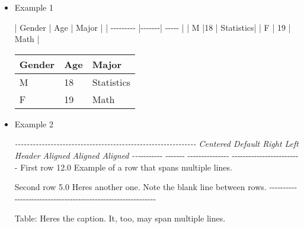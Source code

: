 \documentclass[]{ctexbook}
\newenvironment{Shaded}{\begin{snugshade}}{\end{snugshade}}
\newcommand{\CommentTok}[1]{\textcolor[rgb]{0.56,0.35,0.01}{\textit{#1}}}
\newcommand{\NormalTok}[1]{#1}
\begin{document}
\begin{itemize}
\item
  Example 1

\begin{Shaded}
\begin{Highlighting}[]
\NormalTok{| Gender    | Age   | Major  |}
\NormalTok{| {-}{-}{-}{-}{-}{-}{-}{-}{-} |{-}{-}{-}{-}{-}{-}{-}| {-}{-}{-}{-}{-} |}
\NormalTok{| M         |18     | Statistics|}
\NormalTok{| F         | 19    |   Math |}
\end{Highlighting}
\end{Shaded}

  \begin{longtable}[]{@{}lll@{}}
  \toprule
  Gender & Age & Major\tabularnewline
  \midrule
  \endhead
  M & 18 & Statistics\tabularnewline
  F & 19 & Math\tabularnewline
  \bottomrule
  \end{longtable}
\item
  Example 2

\begin{Shaded}
\begin{Highlighting}[]
\CommentTok{{-}{-}{-}{-}{-}{-}{-}{-}{-}{-}{-}{-}{-}{-}{-}{-}{-}{-}{-}{-}{-}{-}{-}{-}{-}{-}{-}{-}{-}{-}{-}{-}{-}{-}{-}{-}{-}{-}{-}{-}{-}{-}{-}{-}{-}{-}{-}{-}{-}{-}{-}{-}{-}{-}{-}{-}{-}{-}{-}{-}{-}}
\CommentTok{ Centered   Default           Right Left}
\CommentTok{  Header    Aligned         Aligned Aligned}
\CommentTok{{-}{-}{-}}\NormalTok{{-}{-}{-}{-}{-}{-}{-}{-} {-}{-}{-}{-}{-}{-}{-} {-}{-}{-}{-}{-}{-}{-}{-}{-}{-}{-}{-}{-}{-}{-} {-}{-}{-}{-}{-}{-}{-}{-}{-}{-}{-}{-}{-}{-}{-}{-}{-}{-}{-}{-}{-}{-}{-}{-}{-}}
\NormalTok{   First    row                12.0 Example of a row that}
\NormalTok{                                    spans multiple lines.}

\NormalTok{  Second    row                 5.0 Here\textquotesingle{}s another one. Note}
\NormalTok{                                    the blank line between}
\NormalTok{                                    rows.}
\NormalTok{{-}{-}{-}{-}{-}{-}{-}{-}{-}{-}{-}{-}{-}{-}{-}{-}{-}{-}{-}{-}{-}{-}{-}{-}{-}{-}{-}{-}{-}{-}{-}{-}{-}{-}{-}{-}{-}{-}{-}{-}{-}{-}{-}{-}{-}{-}{-}{-}{-}{-}{-}{-}{-}{-}{-}{-}{-}{-}{-}{-}{-}}

\NormalTok{Table: Here\textquotesingle{}s the caption. It, too, may span}
\NormalTok{multiple lines.}
\end{Highlighting}
\end{Shaded}


\end{itemize}
\end{document}
